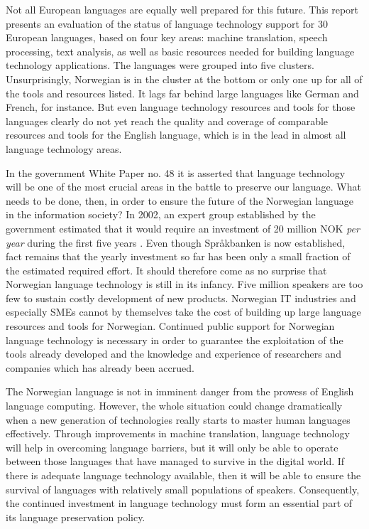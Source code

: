 \begin{multicols}{2}
Not all European languages are equally well prepared for this future. This report presents an evaluation of the status of language technology support for 30 European languages, based on four key areas: machine translation, speech processing, text analysis, as well as basic resources needed for building language technology applications. The languages were grouped into five clusters. Unsurprisingly, Norwegian is in the cluster at the bottom or only one up for all of the tools and resources listed. It lags far behind large languages like German and French, for instance. But even language technology resources and tools for those languages clearly do not yet reach the quality and coverage of comparable resources and tools for the English language, which is in the lead in almost all language technology areas.

In the government White Paper no. 48 \cite{stm48:2002} it is asserted that language technology will be one of the most crucial areas in the battle to preserve our language. What needs to be done, then, in order to ensure the future of the Norwegian language in the information society? In 2002, an expert group established by the government estimated that it would require an investment of 20 million NOK \emph{per year} during the first five years \cite{SR:2002:eng}. Even though Språkbanken is now established, fact remains that the yearly investment so far has been only a small fraction of the estimated required effort. It should therefore come as no surprise that Norwegian language technology is still in its infancy. Five million speakers are too few to sustain costly development of new products. Norwegian IT industries and especially SMEs cannot by themselves take the cost of building up large language resources and tools for Norwegian. Continued public support for Norwegian language technology is necessary in order to guarantee the exploitation of the tools already developed and the knowledge and experience of researchers and companies which has already been accrued.

The Norwegian language is not in imminent danger from the prowess of English language computing. However, the whole situation could change dramatically when a new generation of technologies really starts to master human languages effectively. Through improvements in machine translation, language technology will help in overcoming language barriers, but it will only be able to operate between those languages that have managed to survive in the digital world. If there is adequate language technology available, then it will be able to ensure the survival of languages with relatively small populations of speakers. Consequently, the continued investment in language technology must form an essential part of its language preservation policy. 


\end{multicols}
